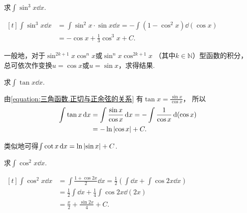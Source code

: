 \begin{example}
求\(\int \sin^3 x \dd{x}\).
\begin{solution}
\(\begin{aligned}[t]
	\int \sin^3 x \dd{x}
	&= \int \sin^2 x \cdot \sin x \dd{x}
	= -\int (1 - \cos^2 x) \dd(\cos x) \\
	&= -\cos x + \frac{1}{3} \cos^3 x + C.
\end{aligned}\)
\end{solution}
\end{example}

\begin{remark}
一般地，对于\(\sin^{2k+1} x \cos^n x\)或\(\sin^n x \cos^{2k+1} x\)
（其中\(k\in\mathbb{N}\)）型函数的积分，
总可依次作变换\(u = \cos x\)或\(u = \sin x\)，求得结果.
\end{remark}

\begin{example}
求\(\int \tan x \dd{x}\).
\begin{solution}
由\cref{equation:三角函数.正切与正余弦的关系}
有\(\tan x = \frac{\sin x}{\cos x}\)，
所以\begin{align*}
	\int \tan x \dd{x}
	&= \int \frac{\sin x}{\cos x} \dd{x}
	= - \int \frac{1}{\cos x} \dd(\cos x) \\
	&= - \ln\abs{\cos x} + C.
\end{align*}
\end{solution}
\end{example}

类似地可得\(\int \cot x \dd{x} = \ln\abs{\sin x} + C\).

\begin{example}
求\(\int \cos^2 x \dd{x}\).
\begin{solution}
\(\begin{aligned}[t]
	\int \cos^2 x \dd{x}
	&= \int \frac{1 + \cos 2x}{2} \dd{x}
	= \frac{1}{2} \left( \int \dd{x} + \int \cos 2x \dd{x} \right) \\
	&= \frac{1}{2} \int \dd{x} + \frac{1}{4} \int \cos 2x \dd(2x) \\
	&= \frac{x}{2} + \frac{\sin 2x}{4} + C.
\end{aligned}\)
\end{solution}
\end{example}

